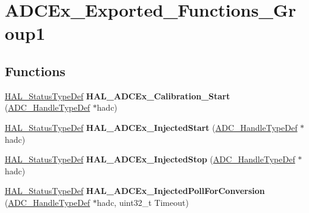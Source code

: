 \hypertarget{group___a_d_c_ex___exported___functions___group1}{}\section{A\+D\+C\+Ex\+\_\+\+Exported\+\_\+\+Functions\+\_\+\+Group1}
\label{group___a_d_c_ex___exported___functions___group1}
\subsection*{Functions}
\begin{DoxyCompactItemize}
\item 
\mbox{\label{group___a_d_c_ex___exported___functions___group1_gabb53dc2716c8250256368c4f60701dab}} 
\hyperlink{stm32f1xx__hal__def_8h_a63c0679d1cb8b8c684fbb0632743478f}{H\+A\+L\+\_\+\+Status\+Type\+Def} {\bfseries H\+A\+L\+\_\+\+A\+D\+C\+Ex\+\_\+\+Calibration\+\_\+\+Start} (\hyperlink{struct_a_d_c___handle_type_def}{A\+D\+C\+\_\+\+Handle\+Type\+Def} $\ast$hadc)
\item 
\mbox{\label{group___a_d_c_ex___exported___functions___group1_gaa666882ff772df8a5140090422825ed6}} 
\hyperlink{stm32f1xx__hal__def_8h_a63c0679d1cb8b8c684fbb0632743478f}{H\+A\+L\+\_\+\+Status\+Type\+Def} {\bfseries H\+A\+L\+\_\+\+A\+D\+C\+Ex\+\_\+\+Injected\+Start} (\hyperlink{struct_a_d_c___handle_type_def}{A\+D\+C\+\_\+\+Handle\+Type\+Def} $\ast$hadc)
\item 
\mbox{\label{group___a_d_c_ex___exported___functions___group1_ga91f6c85ae910e9baaf578a346c30c7c1}} 
\hyperlink{stm32f1xx__hal__def_8h_a63c0679d1cb8b8c684fbb0632743478f}{H\+A\+L\+\_\+\+Status\+Type\+Def} {\bfseries H\+A\+L\+\_\+\+A\+D\+C\+Ex\+\_\+\+Injected\+Stop} (\hyperlink{struct_a_d_c___handle_type_def}{A\+D\+C\+\_\+\+Handle\+Type\+Def} $\ast$hadc)
\item 
\mbox{\label{group___a_d_c_ex___exported___functions___group1_ga5e11b306be79f36c71a73f2e465ad613}} 
\hyperlink{stm32f1xx__hal__def_8h_a63c0679d1cb8b8c684fbb0632743478f}{H\+A\+L\+\_\+\+Status\+Type\+Def} {\bfseries H\+A\+L\+\_\+\+A\+D\+C\+Ex\+\_\+\+Injected\+Poll\+For\+Conversion} (\hyperlink{struct_a_d_c___handle_type_def}{A\+D\+C\+\_\+\+Handle\+Type\+Def} $\ast$hadc, uint32\+\_\+t Timeout)

\end{DoxyCompactItemize}

